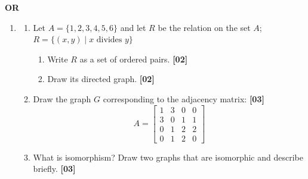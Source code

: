 \documentclass[11pt,a4paper]{article}
\newcommand{\mk}[1]{\hfill\textbf{[#1]}}
\newcommand{\OR}{\begin{center}\textbf{OR}\end{center}\vspace{-6pt}}
\newenvironment{Ql}{\begin{enumerate}[leftmargin=2.5em,labelsep=0.4em,itemsep=5pt,topsep=2pt]}{\end{enumerate}}
\newenvironment{Sl}{\begin{enumerate}[leftmargin=2.3em,labelsep=0.3em,itemsep=3pt,topsep=2pt]}{\end{enumerate}}
\newenvironment{Rl}{\begin{enumerate}[leftmargin=2.2em,labelsep=0.3em,itemsep=1pt,topsep=1pt]}{\end{enumerate}}
\begin{document}
\OR
\begin{Ql}
\item[\textbf{3.}]
 \begin{Sl}
 \item[(a)] Let $A=\{1,2,3,4,5,6\}$ and let $R$ be the relation on the set $A$; $R=\{(x,y)\mid x\text{ divides }y\}$
  \begin{Rl}
  \item[i)] Write $R$ as a set of ordered pairs. \mk{02}
  \item[ii)] Draw its directed graph. \mk{02}
  \end{Rl}
 \item[(b)] Draw the graph $G$ corresponding to the adjacency matrix: \mk{03}
  \[A=\begin{bmatrix}1&3&0&0\\3&0&1&1\\0&1&2&2\\0&1&2&0\end{bmatrix}\]
 \item[(c)] What is isomorphism? Draw two graphs that are isomorphic and describe briefly. \mk{03}
 \end{Sl}
\end{Ql}
\end{document}
